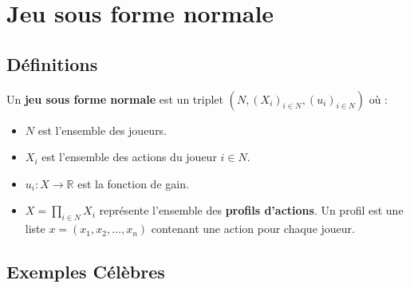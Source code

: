 \begin{itemize}
\begin{center}
\end{center}
\end{itemize}

\section{Jeu sous forme normale}

\subsection{Définitions}
\begin{definition}
Un \textbf{jeu sous forme normale} est un triplet $(N, (X_i)_{i \in N}, (u_i)_{i \in N})$ où :
\begin{itemize}
    \item $N$ est l'ensemble des joueurs.
    \item $X_i$ est l'ensemble des actions du joueur $i \in N$.
    \item $u_i: X \rightarrow \mathbb{R}$ est la fonction de gain.
    \item $X = \prod_{i \in N} X_i$ représente l'ensemble des \textbf{profils d'actions}. Un profil est une liste $x = (x_1, x_2, \dots, x_n)$ contenant une action pour chaque joueur.
\end{itemize}
\end{definition}

\subsection{Exemples Célèbres}


